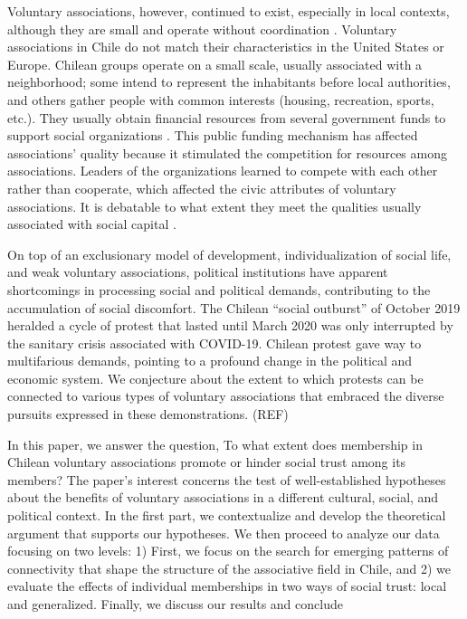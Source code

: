 Voluntary associations, however, continued to exist, especially in local contexts, although they are small and operate without coordination \parencite{espinoza_local_2013}. Voluntary associations in Chile do not match their characteristics in the United States or Europe. Chilean groups operate on a small scale, usually associated with a neighborhood; some intend to represent the inhabitants before local authorities, and others gather people with common interests (housing, recreation, sports, etc.). They usually obtain financial resources from several government funds to support social organizations \parencite{alenda__2013}. This public funding mechanism has affected associations' quality because it stimulated the competition for resources among associations. Leaders of the organizations learned to compete with each other rather than cooperate, which affected the civic attributes of voluntary associations. It is debatable to what extent they meet the qualities usually associated with social capital \parencite{delamaza_sociedad_2002, espinoza_local_2013}.
\bigskip

On top of an exclusionary model of development, individualization of social life, and weak voluntary associations, political institutions have apparent shortcomings in processing social and political demands, contributing to the accumulation of social discomfort. The Chilean “social outburst” of October 2019 heralded a cycle of protest that lasted until March 2020 was only interrupted by the sanitary crisis associated with COVID-19. Chilean protest gave way to multifarious demands, pointing to a profound change in the political and economic system. We conjecture about the extent to which protests can be connected to various types of voluntary associations that embraced the diverse pursuits expressed in these demonstrations. (REF)
\bigskip

In this paper, we answer the question, To what extent does membership in Chilean voluntary associations promote or hinder social trust among its members? The paper's interest concerns the test of well-established hypotheses about the benefits of voluntary associations in a different cultural, social, and political context. In the first part, we contextualize and develop the theoretical argument that supports our hypotheses. We then proceed to analyze our data focusing on two levels: 1) First, we focus on the search for emerging patterns of connectivity that shape the structure of the associative field in Chile, and 2) we evaluate the effects of individual memberships in two ways of social trust: local and generalized. Finally, we discuss our results and conclude


